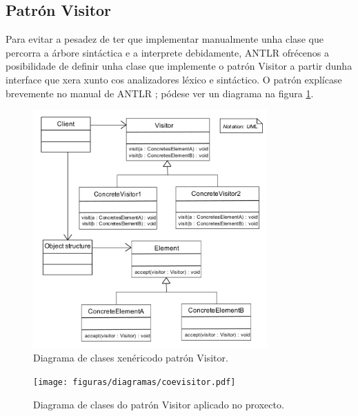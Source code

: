 \subsection{Patrón Visitor}
\label{subsec:visitor}
Para evitar a pesadez de ter que implementar manualmente unha clase que percorra
a árbore sintáctica e a interprete debidamente, ANTLR ofrécenos a posibilidade
de definir unha clase que implemente o patrón Visitor a partir dunha interface
que xera xunto cos analizadores léxico e sintáctico. O patrón explícase
brevemente no manual de ANTLR \cite{antlr4}; pódese ver un diagrama na figura
\ref{fig:visitor}.

\begin{figure}
\centerline{\includegraphics[width=0.8\textwidth]{figuras/diagramas/visitor.png}}
\caption{Diagrama de clases xenéricodo patrón Visitor.}
\label{fig:visitor}
\end{figure}

\begin{figure}
\centerline{\texttt{[image: figuras/diagramas/coevisitor.pdf]}}
\caption{Diagrama de clases do patrón Visitor aplicado no proxecto.}
\label{fig:coevisitor}
\end{figure}

